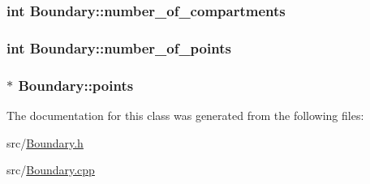 \subsubsection[{number\+\_\+of\+\_\+compartments}]{\setlength{\rightskip}{0pt plus 5cm}int Boundary\+::number\+\_\+of\+\_\+compartments\hspace{0.3cm}{\ttfamily [private]}}\label{class_boundary_a7e69dfe35213b6c0bef5a1479081f1a5}
\hypertarget{class_boundary_a216a0f808019a2383c3c4da1014b4b9f}{}
\subsubsection[{number\+\_\+of\+\_\+points}]{\setlength{\rightskip}{0pt plus 5cm}int Boundary\+::number\+\_\+of\+\_\+points\hspace{0.3cm}{\ttfamily [private]}}\label{class_boundary_a216a0f808019a2383c3c4da1014b4b9f}
\hypertarget{class_boundary_afe159eca3abe85fd1e12c34842552a84}{}
\subsubsection[{points}]{$\ast$ Boundary\+::points}\label{class_boundary_afe159eca3abe85fd1e12c34842552a84}


The documentation for this class was generated from the following files\+:\begin{DoxyCompactItemize}
\item 
src/\hyperlink{_boundary_8h}{Boundary.\+h}\item 
src/\hyperlink{_boundary_8cpp}{Boundary.\+cpp}\end{DoxyCompactItemize}
